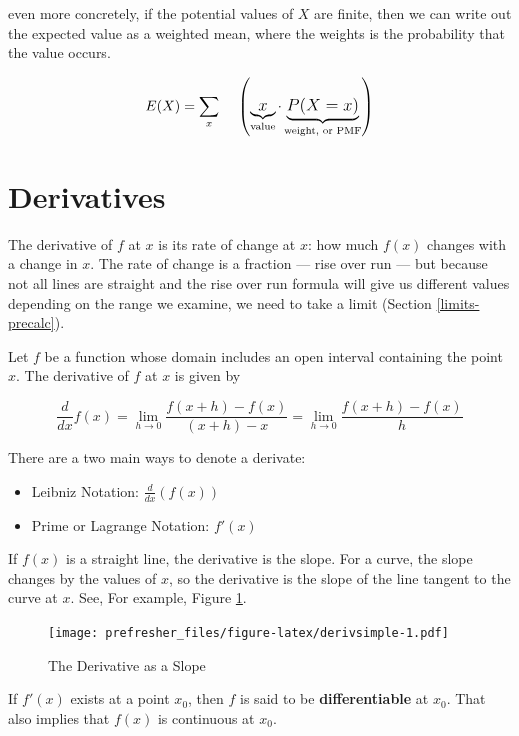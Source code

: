 \documentclass[]{book}
\providecommand{\tightlist}{%
  \setlength{\itemsep}{0pt}\setlength{\parskip}{0pt}}
\theoremstyle{definition}
\theoremstyle{definition}
\theoremstyle{definition}
\theoremstyle{remark}
\let\BeginKnitrBlock\begin \let\EndKnitrBlock\end
\begin{document}
even more concretely, if the potential values of \(X\) are finite, then we can write out the expected value as a weighted mean, where the weights is the probability that the value occurs.

\[E(X) = \large \sum_{x} \quad\left( \underbrace{x}_{\text{value}}\cdot \underbrace{P(X = x)}_{\text{weight, or PMF}}\right)\]

\hypertarget{derivintro}{%
\section{Derivatives}\label{derivintro}}

The derivative of \(f\) at \(x\) is its rate of change at \(x\): how much \(f(x)\) changes with a change in \(x\). The rate of change is a fraction --- rise over run --- but because not all lines are straight and the rise over run formula will give us different values depending on the range we examine, we need to take a limit (Section \ref{limits-precalc}).

\BeginKnitrBlock{definition}[Derivative]
\protect\hypertarget{def:unnamed-chunk-15}{}{\label{def:unnamed-chunk-15} {} }Let \(f\) be a function whose domain includes an open interval containing the point \(x\). The derivative of \(f\) at \(x\) is given by

\[\frac{d}{dx}f(x) =\lim\limits_{h\to 0} \frac{f(x+h)-f(x)}{(x+h)-x} = \lim\limits_{h\to 0} \frac{f(x+h)-f(x)}{h}
\]

There are a two main ways to denote a derivate:

\begin{itemize}
\tightlist
\item
  Leibniz Notation: \(\frac{d}{dx}(f(x))\)
\item
  Prime or Lagrange Notation: \(f'(x)\)
\end{itemize}
\EndKnitrBlock{definition}

If \(f(x)\) is a straight line, the derivative is the slope. For a curve, the slope changes by the values of \(x\), so the derivative is the slope of the line tangent to the curve at \(x\). See, For example, Figure \ref{fig:derivsimple}.

\begin{figure}
\centering
\texttt{[image: prefresher\_files/figure-latex/derivsimple-1.pdf]}
\caption{\label{fig:derivsimple}The Derivative as a Slope}
\end{figure}

If \(f'(x)\) exists at a point \(x_0\), then \(f\) is said to be \textbf{differentiable} at \(x_0\). That also implies that \(f(x)\) is continuous at \(x_0\).
\end{document}
